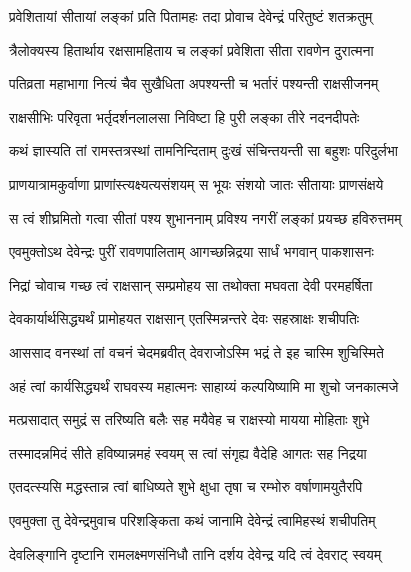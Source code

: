 
\twolineshloka
{प्रवेशितायां सीतायां लङ्कां प्रति पितामहः}
{तदा प्रोवाच देवेन्द्रं परितुष्टं शतक्रतुम्} %

\twolineshloka
{त्रैलोक्यस्य हितार्थाय रक्षसामहिताय च}
{लङ्कां प्रवेशिता सीता रावणेन दुरात्मना} %

\twolineshloka
{पतिव्रता महाभागा नित्यं चैव सुखैधिता}
{अपश्यन्ती च भर्तारं पश्यन्ती राक्षसीजनम्} %

\twolineshloka
{राक्षसीभिः परिवृता भर्तृदर्शनलालसा}
{निविष्टा हि पुरी लङ्का तीरे नदनदीपतेः} %

\twolineshloka
{कथं ज्ञास्यति तां रामस्तत्रस्थां तामनिन्दिताम्}
{दुःखं संचिन्तयन्ती सा बहुशः परिदुर्लभा} %

\twolineshloka
{प्राणयात्रामकुर्वाणा प्राणांस्त्यक्ष्यत्यसंशयम्}
{स भूयः संशयो जातः सीतायाः प्राणसंक्षये} %

\twolineshloka
{स त्वं शीघ्रमितो गत्वा सीतां पश्य शुभाननाम्}
{प्रविश्य नगरीं लङ्कां प्रयच्छ हविरुत्तमम्} %

\twolineshloka
{एवमुक्तोऽथ देवेन्द्रः पुरीं रावणपालिताम्}
{आगच्छन्निद्रया सार्धं भगवान् पाकशासनः} %

\twolineshloka
{निद्रां चोवाच गच्छ त्वं राक्षसान् सम्प्रमोहय}
{सा तथोक्ता मघवता देवी परमहर्षिता} %

\twolineshloka
{देवकार्यार्थसिद्ध्यर्थं प्रामोहयत राक्षसान्}
{एतस्मिन्नन्तरे देवः सहस्राक्षः शचीपतिः} %

\twolineshloka
{आससाद वनस्थां तां वचनं चेदमब्रवीत्}
{देवराजोऽस्मि भद्रं ते इह चास्मि शुचिस्मिते} %

\twolineshloka
{अहं त्वां कार्यसिद्ध्यर्थं राघवस्य महात्मनः}
{साहाय्यं कल्पयिष्यामि मा शुचो जनकात्मजे} %

\twolineshloka
{मत्प्रसादात् समुद्रं स तरिष्यति बलैः सह}
{मयैवेह च राक्षस्यो मायया मोहिताः शुभे} %

\twolineshloka
{तस्मादन्नमिदं सीते हविष्यान्नमहं स्वयम्}
{स त्वां संगृह्य वैदेहि आगतः सह निद्रया} %

\twolineshloka
{एतदत्स्यसि मद्धस्तान्न त्वां बाधिष्यते शुभे}
{क्षुधा तृषा च रम्भोरु वर्षाणामयुतैरपि} %

\twolineshloka
{एवमुक्ता तु देवेन्द्रमुवाच परिशङ्किता}
{कथं जानामि देवेन्द्रं त्वामिहस्थं शचीपतिम्} %

\twolineshloka
{देवलिङ्गानि दृष्टानि रामलक्ष्मणसंनिधौ}
{तानि दर्शय देवेन्द्र यदि त्वं देवराट् स्वयम्} %

